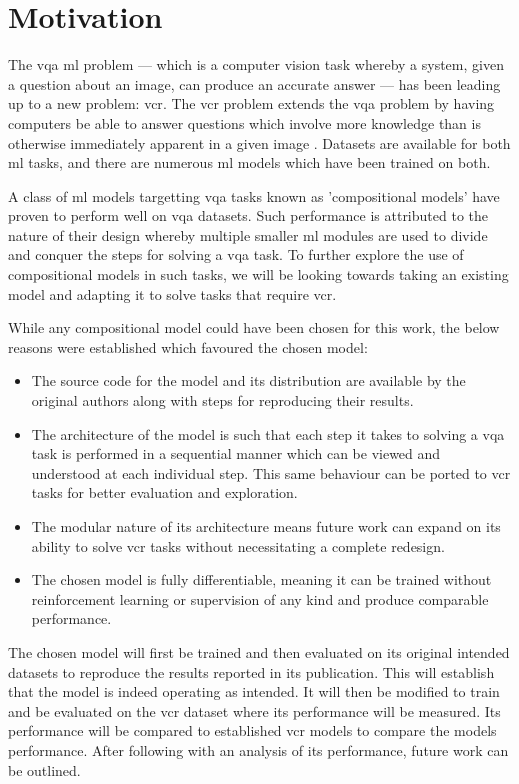 \chapter{Motivation}
\label{chp:motivation}

The \acrlong{vqa} \gls{ml} problem --- which is a computer vision task whereby a system, given a question about an image, can produce an accurate answer \cite{agrawal_vqa_2016} --- has been leading up to a new problem: \acrfull{vcr}.
The \acrshort{vcr} problem extends the \acrshort{vqa} problem by having computers be able to answer questions which involve more knowledge than is otherwise immediately apparent in a given image \cite{zellers_recognition_2019}.
Datasets are available for both \gls{ml} tasks, and there are numerous \gls{ml} models which have been trained on both. 

A class of \gls{ml} models targetting \gls{vqa} tasks known as 'compositional models' have proven to perform well on \gls{vqa} datasets.
Such performance is attributed to the nature of their design whereby multiple smaller \gls{ml} modules are used to divide and conquer the steps for solving a \gls{vqa} task.
To further explore the use of compositional models in such tasks, we will be looking towards taking an existing model and adapting it to solve tasks that require \gls{vcr}.

While any compositional model could have been chosen for this work, the below reasons were established which favoured the chosen model:

\begin{itemize}\label{list:reasons_for_nmn}
    \item The source code for the model and its distribution are available by the original authors along with steps for reproducing their results.
    \item The architecture of the model is such that each step it takes to solving a \gls{vqa} task is performed in a sequential manner which can be viewed and understood at each individual step. This same behaviour can be ported to \gls{vcr} tasks for better evaluation and exploration.
    \item The modular nature of its architecture means future work can expand on its ability to solve \gls{vcr} tasks without necessitating a complete redesign.
    \item The chosen model is fully differentiable, meaning it can be trained without reinforcement learning or supervision of any kind and produce comparable performance.
\end{itemize}

The chosen model will first be trained and then evaluated on its original intended datasets to reproduce the results reported in its publication.
This will establish that the model is indeed operating as intended.
It will then be modified to train and be evaluated on the \gls{vcr} dataset where its performance will be measured.
Its performance will be compared to established \gls{vcr} models to compare the models performance.
After following with an analysis of its performance, future work can be outlined.
